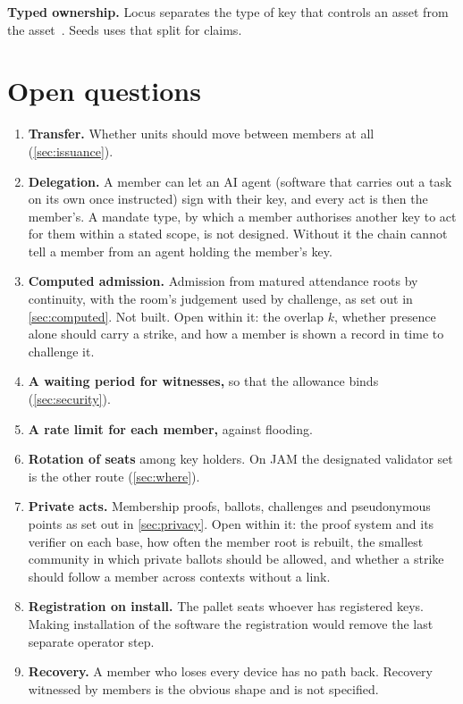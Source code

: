 \documentclass[11pt,a4paper]{article}
\theoremstyle{definition}
\theoremstyle{plain}
\theoremstyle{remark}
\begin{document}
\textbf{Typed ownership.} Locus separates the type of key that controls an asset from the asset~\cite{locus2025}. Seeds uses that split for claims.

\section{Open questions}
\label{sec:open}

\begin{enumerate}
  \item \textbf{Transfer.} Whether units should move between members at all (\cref{sec:issuance}).
  \item \textbf{Delegation.} A member can let an AI agent (software that carries out a task on its own once instructed) sign with their key, and every act is then the member's. A mandate type, by which a member authorises another key to act for them within a stated scope, is not designed. Without it the chain cannot tell a member from an agent holding the member's key.
  \item \textbf{Computed admission.} Admission from matured attendance roots by continuity, with the room's judgement used by challenge, as set out in \cref{sec:computed}. Not built. Open within it: the overlap $k$, whether presence alone should carry a strike, and how a member is shown a record in time to challenge it.
  \item \textbf{A waiting period for witnesses,} so that the allowance binds (\cref{sec:security}).
  \item \textbf{A rate limit for each member,} against flooding.
  \item \textbf{Rotation of seats} among key holders. On JAM the designated validator set is the other route (\cref{sec:where}).
  \item \textbf{Private acts.} Membership proofs, ballots, challenges and pseudonymous points as set out in \cref{sec:privacy}. Open within it: the proof system and its verifier on each base, how often the member root is rebuilt, the smallest community in which private ballots should be allowed, and whether a strike should follow a member across contexts without a link.
  \item \textbf{Registration on install.} The pallet seats whoever has registered keys. Making installation of the software the registration would remove the last separate operator step.
  \item \textbf{Recovery.} A member who loses every device has no path back. Recovery witnessed by members is the obvious shape and is not specified.

\end{enumerate}
\end{document}
